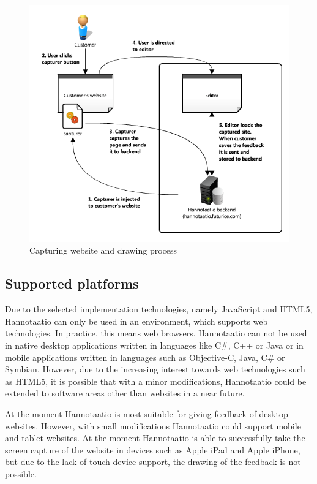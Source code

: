 \documentclass[english,12pt,a4paper,pdftex]{article}
\begin{document}
\begin{figure}[htb]
\begin{center}
\includegraphics[width=1.0\textwidth]{hannotaatio_architecture.png}
\end{center}
\caption{Capturing website and drawing process}
\label{fig:hannotaatio_architecture}
\end{figure}

\subsection{Supported platforms}

Due to the selected implementation technologies, namely JavaScript and HTML5, Hannotaatio can only be used in an environment, which supports web technologies. In practice, this means web browsers. Hannotaatio can not be used in native desktop applications written in languages like C\#, C++ or Java or in mobile applications written in languages such as Objective-C, Java, C\# or Symbian. However, due to the increasing interest towards web technologies such as HTML5, it is possible that with a minor modifications, Hannotaatio could be extended to software areas other than websites in a near future.

At the moment Hannotaatio is most suitable for giving feedback of desktop websites. However, with small modifications Hannotaatio could support mobile and tablet websites. At the moment Hannotaatio is able to successfully take the screen capture of the website in devices such as Apple iPad and Apple iPhone, but due to the lack of touch device support, the drawing of the feedback is not possible.
\end{document}
